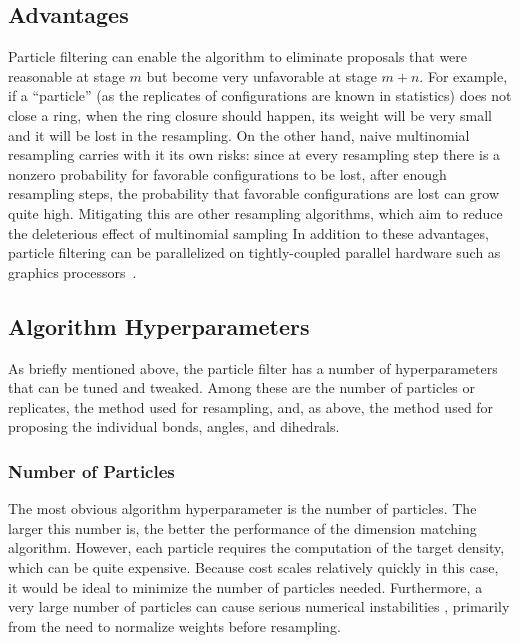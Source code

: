 \subsection{Advantages}
%
Particle filtering can enable the algorithm to eliminate proposals that were reasonable at stage $m$ but become very unfavorable at stage $m+n$.
%
For example, if a “particle” (as the replicates of configurations are known in statistics) does not close a ring, when the ring closure should happen, its weight will be very small and it will be lost in the resampling.
%
On the other hand, naive multinomial resampling carries with it its own risks: since at every resampling step there is a nonzero probability for favorable configurations to be lost, after enough resampling steps, the probability that favorable configurations are lost can grow quite high.
%
Mitigating this are other resampling algorithms, which aim to reduce the deleterious effect of multinomial sampling
%
In addition to these advantages, particle filtering can be parallelized on tightly-coupled parallel hardware such as graphics processors~\cite{lee2010utility}.
%
\subsection{Algorithm Hyperparameters}
%
As briefly mentioned above, the particle filter has a number of hyperparameters that can be tuned and tweaked.
%
Among these are the number of particles or replicates, the method used for resampling, and, as above, the method used for proposing the individual bonds, angles, and dihedrals. 
%
\subsubsection{Number of Particles}
The most obvious algorithm hyperparameter is the number of particles. The larger this number is, the better the performance of the dimension matching algorithm.
%
However, each particle requires the computation of the target density, which can be quite expensive.
%
Because cost scales relatively quickly in this case, it would be ideal to minimize the number of particles needed.
%
Furthermore, a very large number of particles can cause serious numerical instabilities \cite{Murray2016}, primarily from the need to normalize weights before resampling.
%

